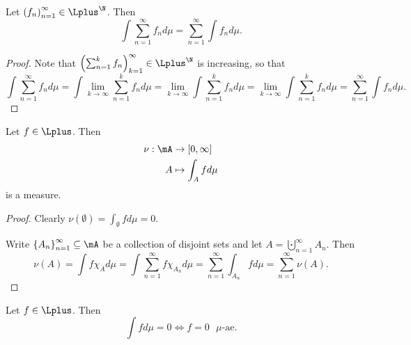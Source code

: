 \documentclass[pmath451]{subfiles}
\begin{document}
    \begin{prop}{}
        Let $\left( f_{n} \right)^{\infty}_{n=1}\in\Lplus^{\N}$. Then
        \begin{equation*}
            \int\sum^{\infty}_{n=1}f_nd\mu = \sum^{\infty}_{n=1}\int f_nd\mu.
        \end{equation*}
    \end{prop}

    \begin{proof}
        Note that $\left( \sum^{k}_{n=1}f_n \right)^{\infty}_{k=1}\in\Lplus^{\N}$ is increasing, so that
        \begin{equation*}
            \int\sum^{\infty}_{n=1}f_nd\mu = \int\lim_{k\to\infty}\sum^{k}_{n=1}f_nd\mu = \lim_{k\to\infty}\int\sum^{k}_{n=1}f_nd\mu = \lim_{k\to\infty}\int \sum^{k}_{n=1}f_nd\mu = \sum^{\infty}_{n=1}\int f_nd\mu.
        \end{equation*}
    \end{proof}
    
    \begin{prop}{}
        Let $f\in\Lplus$. Then
        \begin{equation*}
            \begin{aligned}
                \nu:\mA&\to\left[ 0,\infty \right] \\
                A & \mapsto \int_Afd\mu
            \end{aligned} 
        \end{equation*}
        is a measure.
    \end{prop}

    \begin{proof}
        Clearly $\nu\left( \emptyset \right) = \int_{\emptyset}fd\mu = 0$. 

        Write $\left\lbrace A_n \right\rbrace^{\infty}_{n=1}\subseteq\mA$ be a collection of disjoint sets and let $A = \bigcupdot^{\infty}_{n=1}A_n$. Then
        \begin{equation*}
            \nu\left( A \right) = \int f\chi_Ad\mu = \int\sum^{\infty}_{n=1}f\chi_{A_n}d\mu = \sum^{\infty}_{n=1}\int_{A_n}fd\mu = \sum^{\infty}_{n=1}\nu\left( A \right).
        \end{equation*}
    \end{proof}

    \begin{lemma}{}
        Let $f\in\Lplus$. Then
        \begin{equation*}
            \int fd\mu = 0 \iff f=0\text{ $\mu$-ae}.
        \end{equation*}
    \end{lemma}
    
\end{document}
